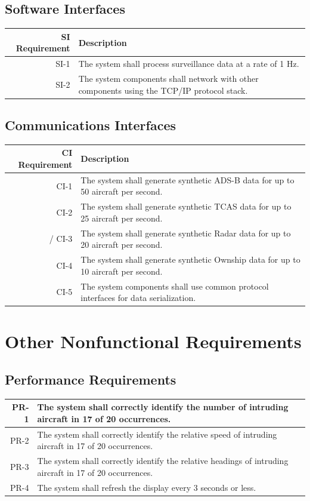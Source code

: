 \documentclass[12pt,oneside,letterpaper]{article}
\begin{document}
\subsection{Software Interfaces}
\begin{longtable}{|r|p{3.8in}|}
\hline
SI Requirement & Description \\
\hline
SI-1 & The system shall process surveillance data at a rate of 1 Hz. \\
\hline
SI-2 & The system components shall network with other components using the TCP/IP protocol stack. \\
\hline
\end{longtable}

\subsection{Communications Interfaces}
\begin{longtable}{|r|p{3.8in}|}
\hline
CI Requirement & Description \\
\hline
CI-1 & The system shall generate synthetic ADS-B data for up to 50 aircraft per second. \\
\hline
CI-2 & The system shall generate synthetic TCAS data for up to 25 aircraft per second. \\
\hline/
CI-3 & The system shall generate synthetic Radar data for up to 20 aircraft per second. \\
\hline
CI-4 & The system shall generate synthetic Ownship data for up to 10 aircraft per second. \\
\hline
CI-5 & The system components shall use common protocol interfaces for data serialization. \\
\hline
\end{longtable}

\section{Other Nonfunctional Requirements}

\subsection{Performance Requirements}
\begin{longtable} {|r|p{3.8in}|}
\hline
PR-1 & The system shall correctly identify the number of intruding aircraft in 17 of 20 occurrences. \\
\hline
PR-2 & The system shall correctly identify the relative speed of intruding aircraft in 17 of 20 occurrences. \\
\hline
PR-3 & The system shall correctly identify the relative headings of intruding aircraft in 17 of 20 occurrences. \\
\hline
PR-4 & The system shall refresh the display every 3 seconds or less. \\
\hline
\end{longtable}
\end{document}

